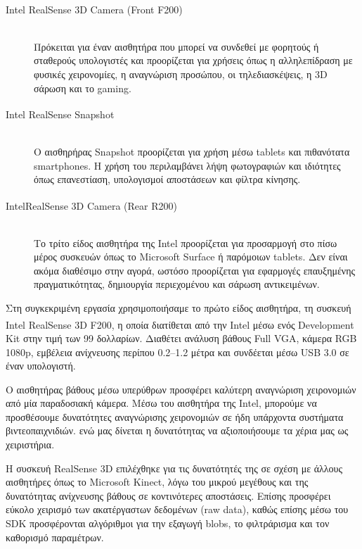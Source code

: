 \begin{description}
  \item[Intel\textsuperscript{\textregistered} RealSense\texttrademark{} 3D Camera (Front F200)] \hfill \\
  Πρόκειται για έναν αισθητήρα που μπορεί να συνδεθεί με φορητούς ή σταθερούς υπολογιστές και προορίζεται για χρήσεις όπως η αλληλεπίδραση με φυσικές χειρονομίες, η αναγνώριση προσώπου, οι τηλεδιασκέψεις, η 3D σάρωση και το gaming.
  
  \item[Intel\textsuperscript{\textregistered} RealSense\texttrademark{} Snapshot] \hfill \\
 Ο αισθηρήρας Snapshot προορίζεται για χρήση μέσω tablets και πιθανότατα smartphones. Η χρήση του περιλαμβάνει λήψη φωτογραφιών και ιδιότητες όπως επανεστίαση, υπολογισμοί αποστάσεων και φίλτρα κίνησης. 


  \item[Intel\textsuperscript{\textregistered}RealSense\texttrademark{} 3D Camera (Rear R200)] \hfill \\
  Το τρίτο είδος αισθητήρα της Intel προορίζεται για προσαρμογή στο πίσω μέρος συσκευών όπως το Microsoft Surface ή παρόμοιων tablets. Δεν είναι ακόμα διαθέσιμο στην αγορά, ωστόσο προορίζεται για εφαρμογές επαυξημένης πραγματικότητας, δημιουργία περιεχομένου και σάρωση αντικειμένων.
\end{description}




Στη συγκεκριμένη εργασία χρησιμοποιήσαμε το πρώτο είδος αισθητήρα, τη συσκευή Intel\textsuperscript{\textregistered} RealSense\texttrademark{} 3D F200, η οποία διατίθεται από την Intel\textsuperscript{\textregistered} μέσω ενός Development Kit στην τιμή των 99 δολλαρίων. Διαθέτει ανάλυση βάθους Full VGA, κάμερα RGB 1080p, εμβέλεια ανίχνευσης περίπου 0.2–1.2 μέτρα και συνδέεται μέσω USB 3.0 σε έναν υπολογιστή.


Ο αισθητήρας βάθους μέσω υπερύθρων προσφέρει καλύτερη αναγνώριση χειρονομιών από μία παραδοσιακή κάμερα. Μέσω του αισθητήρα της Intel, μπορούμε να προσθέσουμε δυνατότητες αναγνώρισης χειρονομιών σε ήδη υπάρχοντα συστήματα βιντεοπαιχνιδιών.
ενώ μας δίνεται η δυνατότητας να αξιοποιήσουμε τα χέρια μας ως χειριστήρια.

Η συσκευή RealSense\texttrademark{} 3D επιλέχθηκε για τις δυνατότητές της σε σχέση με άλλους αισθητήρες όπως το Microsoft Kinect, λόγω του μικρού μεγέθους και της δυνατότητας ανίχνευσης βάθους σε κοντινότερες αποστάσεις. Επίσης προσφέρει εύκολο χειρισμό των ακατέργαστων δεδομένων (raw data), καθώς επίσης μέσω του SDK προσφέρονται αλγόριθμοι για την εξαγωγή blobs, το φιλτράρισμα και τον καθορισμό παραμέτρων. 



